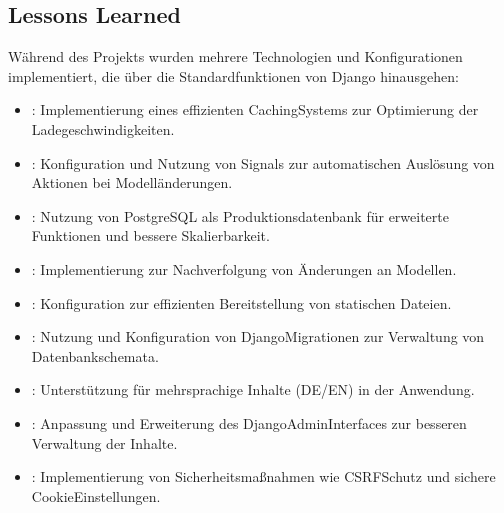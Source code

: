 \documentclass[a4paper,12pt,ngerman]{sphinxmanual}
\begin{document}
\subsection{Lessons Learned}
\label{\detokenize{sections/fazit:lessons-learned}}
\sphinxAtStartPar
Während des Projekts wurden mehrere Technologien und Konfigurationen implementiert, die über die Standardfunktionen von Django hinausgehen:
\begin{itemize}
\item {} 
\sphinxAtStartPar
{}: Implementierung eines effizienten Caching\sphinxhyphen{}Systems zur Optimierung der Ladegeschwindigkeiten.

\item {} 
\sphinxAtStartPar
{}: Konfiguration und Nutzung von Signals zur automatischen Auslösung von Aktionen bei Modelländerungen.

\item {} 
\sphinxAtStartPar
{}: Nutzung von PostgreSQL als Produktionsdatenbank für erweiterte Funktionen und bessere Skalierbarkeit.

\item {} 
\sphinxAtStartPar
{}: Implementierung zur Nachverfolgung von Änderungen an Modellen.

\item {} 
\sphinxAtStartPar
{}: Konfiguration zur effizienten Bereitstellung von statischen Dateien.

\item {} 
\sphinxAtStartPar
{}: Nutzung und Konfiguration von Django\sphinxhyphen{}Migrationen zur Verwaltung von Datenbankschemata.

\item {} 
\sphinxAtStartPar
{}: Unterstützung für mehrsprachige Inhalte (DE/EN) in der Anwendung.

\item {} 
\sphinxAtStartPar
{}: Anpassung und Erweiterung des Django\sphinxhyphen{}Admin\sphinxhyphen{}Interfaces zur besseren Verwaltung der Inhalte.

\item {} 
\sphinxAtStartPar
{}: Implementierung von Sicherheitsmaßnahmen wie CSRF\sphinxhyphen{}Schutz und sichere Cookie\sphinxhyphen{}Einstellungen.

\end{itemize}
\end{document}
